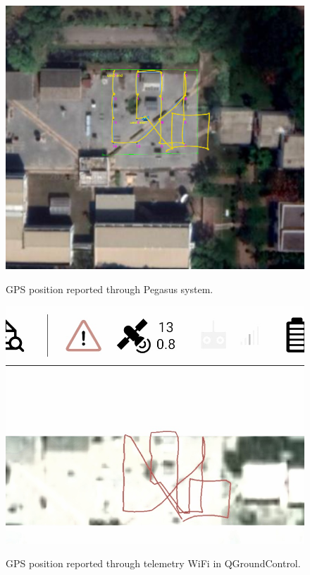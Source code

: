 \begin{figure}
	\centering
	\caption[GPS position reported through Pegasus system.]{\small GPS position reported through Pegasus system.} 
	\includegraphics[width=5in]{figures/experiment/real_mapviz_path}
	\label{fig:real-gps}
\end{figure}

\begin{figure}
	\centering
	\caption[GPS position reported through telemetry wifi.]{\small GPS position reported through telemetry WiFi in QGroundControl.} 
	\includegraphics[width=5in]{figures/experiment/q-ground-control}
	\label{fig:q-real-gps}
\end{figure}


